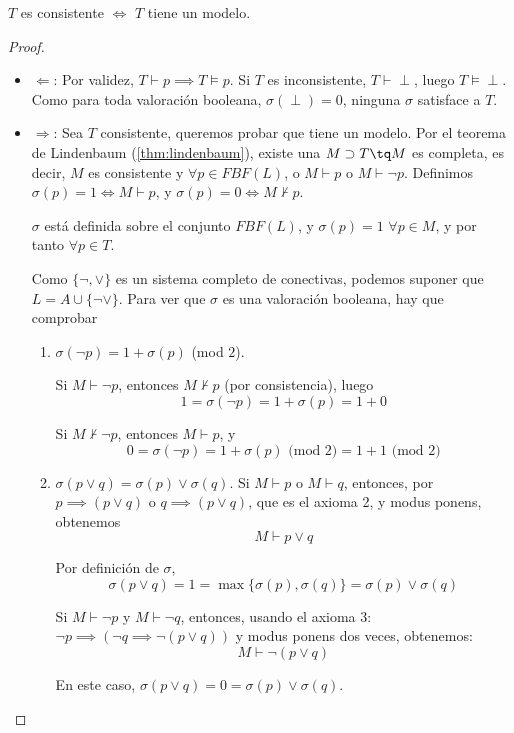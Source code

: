 \begin{theorem}
	$T$ es consistente $\iff$ $T$ tiene un modelo.
	\label{thm:comp2}
\end{theorem}
\begin{proof}
	\begin{itemize}
		\item $\Longleftarrow$: Por validez, $T\vdash p \implies T\vDash p$. Si $T$ es inconsistente, $T\vdash \perp$, luego $T\vDash\perp$. Como para toda valoración booleana, $\sigma(\perp) = 0$, ninguna $\sigma$ satisface a $T$.
		\item $\Longrightarrow$: Sea $T$ consistente, queremos probar que tiene un modelo. Por el teorema de Lindenbaum (\ref{thm:lindenbaum}), existe una $M\supset T \tq M$ es completa, es decir, $M$ es consistente y $\forall p \in FBF(L)$, o $M\vdash p$ o $M\vdash \neg p$. Definimos $\sigma(p) = 1 \iff M\vdash p$, y $\sigma(p) = 0 \iff M\nvdash p$.
		
		$\sigma$ está definida sobre el conjunto $FBF(L)$, y $\sigma(p) = 1$ $\forall p \in M$, y por tanto $\forall p\in T$.
		
		Como $\{\neg, \vee\}$ es un sistema completo de conectivas, podemos suponer que $L=A\cup\{\neg\vee\}$. Para ver que $\sigma$ es una valoración booleana, hay que comprobar
		\begin{enumerate}
			\item $\sigma(\neg p) = 1+\sigma(p)$ (mod $2$).
			
			Si $M \vdash \neg p$, entonces $M\nvdash p$ (por consistencia), luego 
			$$1 = \sigma(\neg p) = 1+\sigma(p) = 1 + 0$$
			
			Si $M \nvdash \neg p$, entonces $M\vdash p$, y
			$$0=\sigma(\neg p) = 1+\sigma(p) \text{ (mod 2)} = 1+1 \text{ (mod 2)}$$
			
			\item $\sigma(p\vee q) = \sigma(p)\vee\sigma(q)$.
			Si $M\vdash p$ o $M\vdash q$, entonces, por $p\implies (p\vee q)$ o $q\implies (p\vee q)$, que es el axioma 2, y modus ponens, obtenemos
			$$M\vdash p \vee q$$
			
			Por definición de $\sigma$,
			$$\sigma(p\vee q) = 1 = \max\{\sigma(p), \sigma(q)\} = \sigma(p)\vee\sigma(q)$$
			
			Si $M\vdash \neg p$ y $M\vdash \neg q$, entonces, usando el axioma 3: $\neg p \implies (\neg q \implies \neg(p\vee q))$ y modus ponens dos veces, obtenemos:
			$$M\vdash \neg(p\vee q)$$
			
			En este caso, $\sigma(p\vee q) = 0 = \sigma(p) \vee \sigma(q)$.
		\end{enumerate}
	\end{itemize}
\end{proof}

